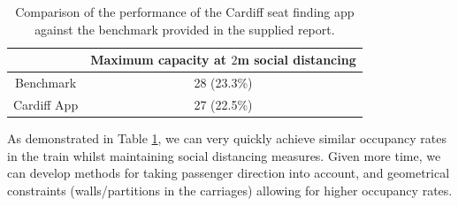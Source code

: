 \documentclass[11pt,a4paper]{article}
\begin{document}








\begin{table}[ht!]
\begin{center}
 \begin{tabular}{|c |c|}
 \hline
& \textbf{Maximum capacity at $2$m social distancing }\\
 \hline

 Benchmark &   28 (23.3\%)\footnotemark \\
 \hline
 Cardiff App  & 27 (22.5\%)\\

\hline
\end{tabular}
\end{center}
\caption{Comparison of the performance of the Cardiff seat finding app against the benchmark provided in the supplied report.}
\label{tab:performance}
\end{table}



As demonstrated in Table \ref{tab:performance}, we can very quickly achieve similar occupancy rates in the train whilst maintaining social distancing measures. Given more time, we can develop methods for taking passenger direction into account, and geometrical constraints (walls/partitions in the carriages) allowing for higher occupancy rates.
\end{document}
